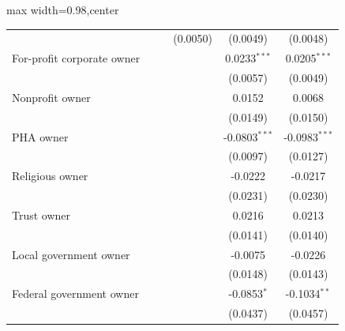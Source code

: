 \begin{table}[htbp]
\begin{adjustbox}{max width=0.98\textwidth,center}
\begin{tabular}{lccccc}
                                                 &                &                & (0.0050)       & (0.0049)        & (0.0048)\\   
         For-profit corporate owner              &                &                &                & 0.0233$^{***}$  & 0.0205$^{***}$\\   
                                                 &                &                &                & (0.0057)        & (0.0049)\\   
         Nonprofit owner                         &                &                &                & 0.0152          & 0.0068\\   
                                                 &                &                &                & (0.0149)        & (0.0150)\\   
         PHA owner                               &                &                &                & -0.0803$^{***}$ & -0.0983$^{***}$\\   
                                                 &                &                &                & (0.0097)        & (0.0127)\\   
         Religious owner                         &                &                &                & -0.0222         & -0.0217\\   
                                                 &                &                &                & (0.0231)        & (0.0230)\\   
         Trust owner                             &                &                &                & 0.0216          & 0.0213\\   
                                                 &                &                &                & (0.0141)        & (0.0140)\\   
         Local government owner                  &                &                &                & -0.0075         & -0.0226\\   
                                                 &                &                &                & (0.0148)        & (0.0143)\\   
         Federal government owner                &                &                &                & -0.0853$^{*}$   & -0.1034$^{**}$\\   
                                                 &                &                &                & (0.0437)        & (0.0457)\\   

\end{tabular}
\end{adjustbox}
\end{table}
